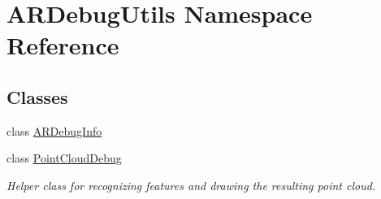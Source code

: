 \hypertarget{namespace_a_r_debug_utils}{}\section{A\+R\+Debug\+Utils Namespace Reference}
\label{namespace_a_r_debug_utils}
\subsection*{Classes}
\begin{DoxyCompactItemize}
\item 
class \mbox{\hyperlink{class_a_r_debug_utils_1_1_a_r_debug_info}{A\+R\+Debug\+Info}}
\item 
class \mbox{\hyperlink{class_a_r_debug_utils_1_1_point_cloud_debug}{Point\+Cloud\+Debug}}
\begin{DoxyCompactList}\small\item\em Helper class for recognizing features and drawing the resulting point cloud. \end{DoxyCompactList}\end{DoxyCompactItemize}
